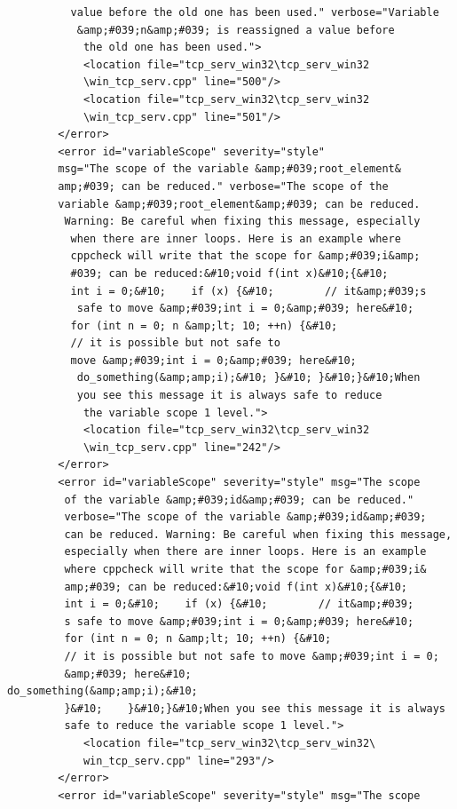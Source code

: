 \documentclass[10pt,a4paper]{report}
\begin{document}
\begin{lstlisting}
          value before the old one has been used." verbose="Variable
           &amp;#039;n&amp;#039; is reassigned a value before
            the old one has been used.">
            <location file="tcp_serv_win32\tcp_serv_win32
            \win_tcp_serv.cpp" line="500"/>
            <location file="tcp_serv_win32\tcp_serv_win32
            \win_tcp_serv.cpp" line="501"/>
        </error>
        <error id="variableScope" severity="style" 
        msg="The scope of the variable &amp;#039;root_element&
        amp;#039; can be reduced." verbose="The scope of the 
        variable &amp;#039;root_element&amp;#039; can be reduced.
         Warning: Be careful when fixing this message, especially
          when there are inner loops. Here is an example where 
          cppcheck will write that the scope for &amp;#039;i&amp;
          #039; can be reduced:&#10;void f(int x)&#10;{&#10;    
          int i = 0;&#10;    if (x) {&#10;        // it&amp;#039;s
           safe to move &amp;#039;int i = 0;&amp;#039; here&#10; 
          for (int n = 0; n &amp;lt; 10; ++n) {&#10;
          // it is possible but not safe to 
          move &amp;#039;int i = 0;&amp;#039; here&#10;
           do_something(&amp;amp;i);&#10; }&#10; }&#10;}&#10;When 
           you see this message it is always safe to reduce
            the variable scope 1 level.">
            <location file="tcp_serv_win32\tcp_serv_win32
            \win_tcp_serv.cpp" line="242"/>
        </error>
        <error id="variableScope" severity="style" msg="The scope
         of the variable &amp;#039;id&amp;#039; can be reduced." 
         verbose="The scope of the variable &amp;#039;id&amp;#039; 
         can be reduced. Warning: Be careful when fixing this message, 
         especially when there are inner loops. Here is an example 
         where cppcheck will write that the scope for &amp;#039;i&
         amp;#039; can be reduced:&#10;void f(int x)&#10;{&#10;    
         int i = 0;&#10;    if (x) {&#10;        // it&amp;#039;
         s safe to move &amp;#039;int i = 0;&amp;#039; here&#10;  
         for (int n = 0; n &amp;lt; 10; ++n) {&#10;            
         // it is possible but not safe to move &amp;#039;int i = 0;
         &amp;#039; here&#10;            do_something(&amp;amp;i);&#10;        
         }&#10;    }&#10;}&#10;When you see this message it is always 
         safe to reduce the variable scope 1 level.">
            <location file="tcp_serv_win32\tcp_serv_win32\
            win_tcp_serv.cpp" line="293"/>
        </error>
        <error id="variableScope" severity="style" msg="The scope 

\end{lstlisting}
\end{document}
